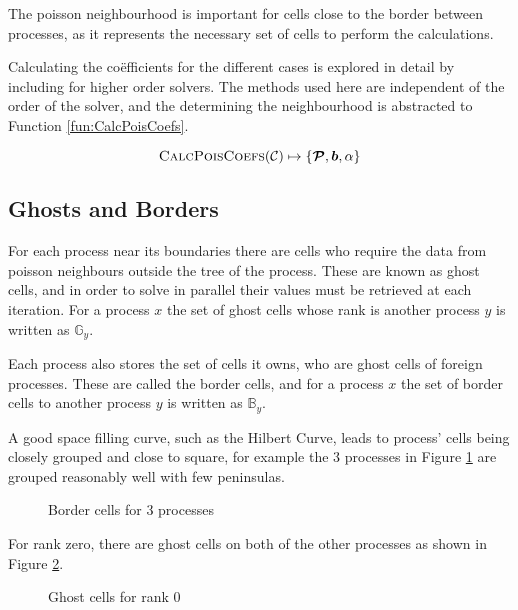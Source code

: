 \documentclass{IIBproject}
\newcommand{\grpath}{../../build/report}
\newcommand{\vect}[1]{\bm{#1}}
\begin{document}
The poisson neighbourhood is important for cells close to the border between processes, as it represents the necessary set of cells to perform the calculations. 

Calculating the co\"efficients for the different cases is explored in detail by \cite{Yung2010} including for higher order solvers. The methods used here are independent of the order of the solver, and the determining the neighbourhood is abstracted to Function \ref{fun:CalcPoisCoefs}. 

\begin{equation}
	\label{fun:CalcPoisCoefs}
	\textproc{CalcPoisCoefs}(\mathcal{C}) \mapsto \{ \vect{\mathcal{P}}, \vect{b}, \alpha \}
\end{equation}

\subsection{Ghosts and Borders}
\label{sec:ghostsandborders}

For each process near its boundaries there are cells who require the data from poisson neighbours outside the tree of the process. These are known as ghost cells, and in order to solve in parallel their values must be retrieved at each iteration. For a process $x$ the set of ghost cells whose rank is another process $y$ is written as $\mathbb{G}_y$. 

Each process also stores the set of cells it owns, who are ghost cells of foreign processes. These are called the border cells, and for a process $x$ the set of border cells to another process $y$ is written as $\mathbb{B}_y$.

A good space filling curve, such as the Hilbert Curve, leads to process' cells being closely grouped and close to square, for example the 3 processes in Figure \ref{fig:borderline} are grouped reasonably well with few peninsulas. 

\begin{figure}[H]
	\label{fig:borderline}
	\caption{Border cells for 3 processes}
	
\end{figure}

For rank zero, there are ghost cells on both of the other processes as shown in Figure \ref{fig:borders-r0}. 

\begin{figure}[H]
	\label{fig:borders-r0}
	\caption{Ghost cells for rank 0}
	
\end{figure}
\end{document}
